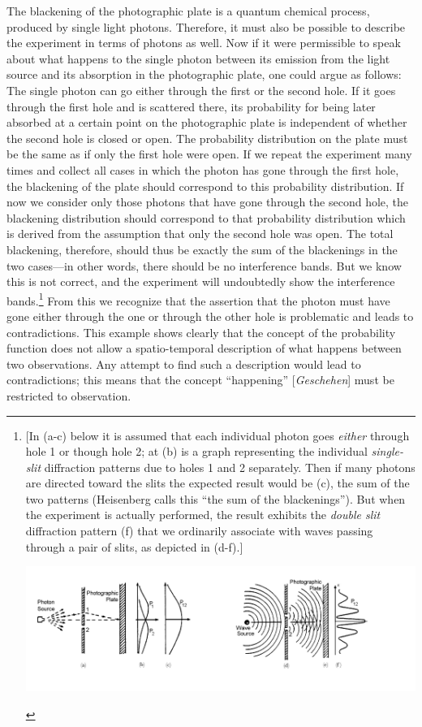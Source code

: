 The blackening of the photographic plate is a quantum chemical process,
produced by single light photons. Therefore, it must also be possible to
describe the experiment in terms of photons as well. Now if it were
permissible to speak about what happens to the single photon between its
emission from the light source and its absorption in the photographic
plate, one could argue as follows: The single photon can go either
through the first or the second hole. If it goes through the first hole
and is scattered there, its probability for being later absorbed at a
certain point on the photographic plate is independent of whether the
second hole is closed or open. The probability distribution on the plate
must be the same as if only the first hole were open. If we repeat the
experiment many times and collect all cases in which the photon has gone
through the first hole, the blackening of the plate should correspond to
this probability distribution. If now we consider only those photons
that have gone through the second hole, the blackening distribution
should correspond to that probability distribution which is derived from
the assumption that only the second hole was open. The total blackening,
therefore, should thus be exactly the sum of the blackenings in the two
cases---in other words, there should be no interference bands. But we
know this is not correct, and the experiment will undoubtedly show the
interference bands.\footnote{{[}In (a-c) below it is assumed that each
  individual photon goes \emph{either} through hole 1 or though hole 2;
  at (b) is a graph representing the individual \emph{single-slit}
  diffraction patterns due to holes 1 and 2 separately. Then if many
  photons are directed toward the slits the expected result would be
  (c), the sum of the two patterns (Heisenberg calls this ``the sum of
  the blackenings''). But when the experiment is actually performed, the
  result exhibits the \emph{double slit} diffraction pattern (f) that we
  ordinarily associate with waves passing through a pair of slits, as
  depicted in (d-f).{]}
  \begin{center}
    \includegraphics[width=\textwidth,height=.32054\textwidth]{images/10_heisenberg/image058.png}
  \end{center}
  
  } From this we recognize that the assertion that
the photon must have gone either through the one or through the other
hole is problematic and leads to contradictions. This example shows
clearly that the concept of the probability function does not allow a
spatio-temporal description of what happens between two observations.
Any attempt to find such a description would lead to contradictions;
this means that the concept ``happening'' {[}\emph{Geschehen}{]} must be
restricted to observation.

